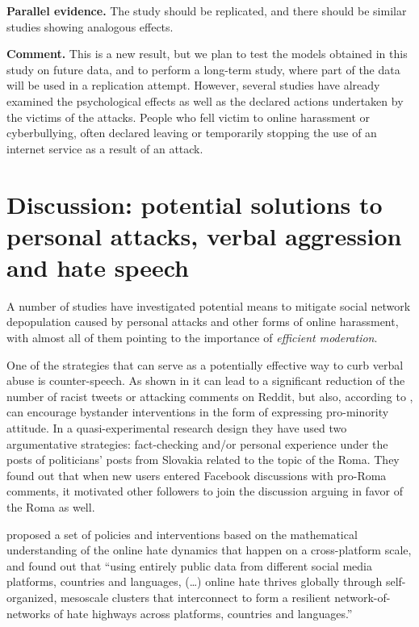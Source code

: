 \documentclass[a4paper,fleqn]{cas-dc}
\begin{document}
\begin{description}
\item \textbf{Parallel evidence.} The study should be replicated, and there should be similar studies showing analogous effects. 


\textbf{Comment.} This is a new result, but we plan to test the models obtained in this study on future data, and to perform a long-term study, where part of the data will be used in a replication attempt. However, several studies have already examined the psychological effects as well as the declared actions undertaken by the victims of the attacks. People who fell victim to online harassment or cyberbullying, often  declared leaving or temporarily stopping the use of an internet service as a result of an attack. 




\end{description}

\section{Discussion: potential solutions to personal attacks, verbal aggression and hate speech}
\label{discussion}

A number of studies have investigated potential means to mitigate social
network depopulation caused by personal attacks and other forms of
online harassment, with almost all of them pointing to the importance of
\textit{efficient moderation}.




One of the strategies that can serve as a potentially effective way to
curb verbal abuse is counter-speech. As shown in \citep{munger2017tweetment,Bilewicz2021Artificial} it can
lead to a significant reduction of the number of racist tweets or attacking comments on Reddit, but
also, according to \citet{mivskolci2020countering}, can encourage
bystander interventions in the form of expressing pro-minority attitude.
In a quasi-experimental research design they have used two argumentative
strategies: fact-checking and/or personal experience under the posts of
politicians' posts from Slovakia related to the topic of the Roma. They
found out that when new users entered Facebook discussions with pro-Roma
comments, it motivated other followers to join the discussion arguing in
favor of the Roma as well.

\citet{johnson2019hidden} proposed a set of policies and interventions
based on the mathematical understanding of the online hate dynamics that
happen on a cross-platform scale, and found out that ``using entirely
public data from different social media platforms, countries and
languages, (\dots) online hate thrives globally through self-organized,
mesoscale clusters that interconnect to form a resilient
network-of-networks of hate highways across platforms, countries and
languages.''
\end{document}

